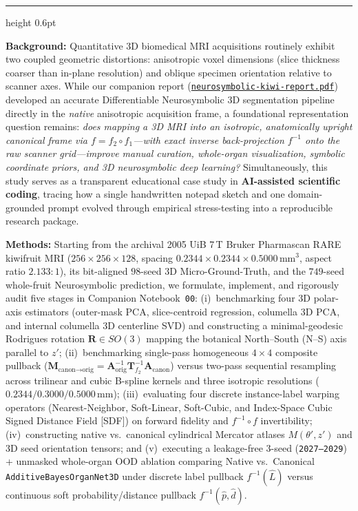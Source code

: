 \documentclass[10pt,a4paper]{article}
\renewcommand{\_}{\origunderscore\allowbreak}
\newcommand{\ghblob}{https://github.com/arvidl/BMED365-2027/blob/main}
\newcommand{\repodir}{Lab4-Comp-Imag/Kiwi-challenge/docs/neurosymbolic-report}
\newcommand{\natrep}{\href{\ghblob/\repodir/neurosymbolic-kiwi-report.pdf}{\texttt{neurosymbolic-\allowbreak kiwi-\allowbreak report.pdf}}}
\begin{document}
\vspace{0.20cm}
\hrule height 0.6pt \relax
\vspace{0.18cm}

\begin{keybox}
\scriptsize\setlength{\parskip}{0.26em}
\textbf{Background:} Quantitative 3D biomedical MRI acquisitions routinely exhibit two coupled geometric distortions: anisotropic voxel dimensions (slice thickness coarser than in-plane resolution) and oblique specimen orientation relative to scanner axes. While our companion report (\natrep{}) developed an accurate Differentiable Neurosymbolic 3D segmentation pipeline directly in the \emph{native} anisotropic acquisition frame, a foundational representation question remains: \emph{does mapping a 3D MRI into an isotropic, anatomically upright canonical frame via $f = f_2 \circ f_1$---with exact inverse back-projection $f^{-1}$ onto the raw scanner grid---improve manual curation, whole-organ visualization, symbolic coordinate priors, and 3D neurosymbolic deep learning?} Simultaneously, this study serves as a transparent educational case study in \textbf{AI-assisted scientific coding}, tracing how a single handwritten notepad sketch and one domain-grounded prompt evolved through empirical stress-testing into a reproducible research package.

\textbf{Methods:} Starting from the archival 2005 UiB 7\,T Bruker Pharmascan RARE kiwifruit MRI ($256 \times 256 \times 128$, spacing $0.2344 \times 0.2344 \times 0.5000\,\text{mm}^3$, aspect ratio $2.133:1$), its bit-aligned $98$-seed 3D Micro-Ground-Truth, and the $749$-seed whole-fruit Neurosymbolic prediction, we formulate, implement, and rigorously audit five stages in Companion Notebook~\texttt{00}: (i)~benchmarking four 3D polar-axis estimators (outer-mask PCA, slice-centroid regression, columella 3D PCA, and internal columella 3D centerline SVD) and constructing a minimal-geodesic Rodrigues rotation $\mathbf{R} \in SO(3)$ mapping the botanical North--South (N--S) axis parallel to $z'$; (ii)~benchmarking single-pass homogeneous $4\times 4$ composite pullback ($\mathbf{M}_{\text{canon}\to\text{orig}} = \mathbf{A}_{\text{orig}}^{-1}\mathbf{T}_{f_2}^{-1}\mathbf{A}_{\text{canon}}$) versus two-pass sequential resampling across trilinear and cubic B-spline kernels and three isotropic resolutions ($0.2344 / 0.3000 / 0.5000\,\text{mm}$); (iii)~evaluating four discrete instance-label warping operators (Nearest-Neighbor, Soft-Linear, Soft-Cubic, and Index-Space Cubic Signed Distance Field [SDF]) on forward fidelity and $f^{-1}\circ f$ invertibility; (iv)~constructing native vs.\ canonical cylindrical Mercator atlases $M(\theta', z')$ and 3D seed orientation tensors; and (v)~executing a leakage-free 3-seed (\texttt{2027--2029}) + unmasked whole-organ OOD ablation comparing Native vs.\ Canonical \texttt{AdditiveBayesOrganNet3D} under discrete label pullback $f^{-1}(\hat{L})$ versus continuous soft probability/distance pullback $f^{-1}(\hat{p}, \hat{d})$.


\end{keybox}
\end{document}
